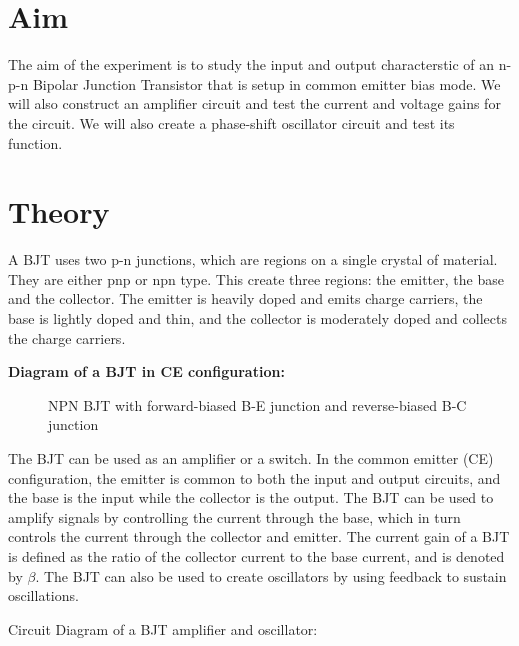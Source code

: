 \documentclass[../main.tex]{subfiles}
\begin{document}
\setcounter{page}{11}

\vspace*{1cm}
\section{Aim}
The aim of the experiment is to study the input and output characterstic of an n-p-n Bipolar Junction Transistor that is setup in common emitter bias mode. We will also construct an amplifier circuit and test the current and voltage gains for the circuit. We will also create a phase-shift oscillator circuit and test its function.

\section{Theory}
A BJT uses two p-n junctions, which are regions on a single crystal of material.
They are either pnp or npn type.
This create three regions: the emitter, the base and the collector.
The emitter is heavily doped and emits charge carriers, the base is lightly doped and thin, and the collector is moderately doped and collects the charge carriers.

\textbf{Diagram of a BJT in CE configuration:}
\begin{figure}[H]
	\centering
	
	\label{fig:bjt_wiki}
	\caption{NPN BJT with forward-biased B-E junction and reverse-biased B-C junction}
\end{figure}
The BJT can be used as an amplifier or a switch.
In the common emitter (CE) configuration, the emitter is common to both the input and output circuits, and the base is the input while the collector is the output.
The BJT can be used to amplify signals by controlling the current through the base, which in turn controls the current through the collector and emitter.
The current gain of a BJT is defined as the ratio of the collector current to the base current, and is denoted by $\beta$.
The BJT can also be used to create oscillators by using feedback to sustain oscillations.

\noindent Circuit Diagram of a BJT amplifier and oscillator:
\end{document}
